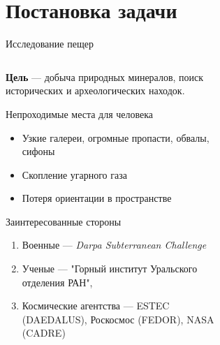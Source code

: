 \section{Постановка задачи}

\begin{frame}[t]{Исследование пещер}


    \begin{columns}[T,onlytextwidth]
        \begin{column}{0.59\textwidth}
            \small
                \textbf{Цель} --- добыча природных минералов, поиск исторических и археологических находок.
            \begin{exampleblock}{Непроходимые места для человека}
                \begin{itemize}
                    \item Узкие галереи, огромные пропасти, обвалы, сифоны
                    \item Скопление угарного газа
                    \item Потеря ориентации в пространстве
                \end{itemize}
            \end{exampleblock}
            \vspace{-0.2cm}
            \begin{alertblock}{Заинтересованные стороны}
                \begin{enumerate}
                    \item Военные --- \textit{Darpa Subterranean Challenge}
                    \item Ученые --- "Горный институт Уральского отделения РАН", 
                    \item Космические агентства --- ESTEC (DAEDALUS), Роскосмос (FEDOR), NASA (CADRE)
                \end{enumerate}
            \end{alertblock}
        \end{column}
        \begin{column}{0.39\textwidth}
            \begin{figure}[H]
                \begin{subfigure}{0.49\textwidth}
                    \centering\includegraphics[height=2cm,width=1\textwidth,keepaspectratio]{../images/slides/rip.jpg}

\end{subfigure}
\end{figure}
\end{column}
\end{columns}
\end{frame}
